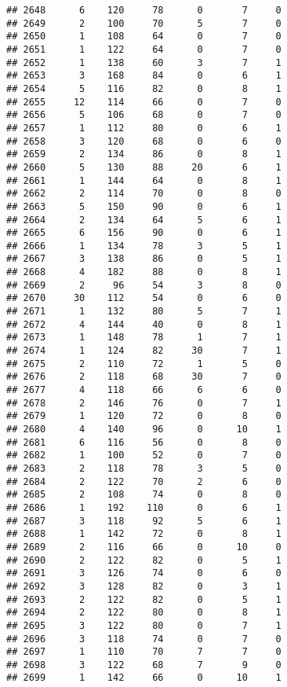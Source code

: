 \documentclass[
]{article}
\begin{document}
\begin{verbatim}
## 2648      6    120     78      0       7     0
## 2649      2    100     70      5       7     0
## 2650      1    108     64      0       7     0
## 2651      1    122     64      0       7     0
## 2652      1    138     60      3       7     1
## 2653      3    168     84      0       6     1
## 2654      5    116     82      0       8     1
## 2655     12    114     66      0       7     0
## 2656      5    106     68      0       7     0
## 2657      1    112     80      0       6     1
## 2658      3    120     68      0       6     0
## 2659      2    134     86      0       8     1
## 2660      5    130     88     20       6     1
## 2661      1    144     64      0       8     1
## 2662      2    114     70      0       8     0
## 2663      5    150     90      0       6     1
## 2664      2    134     64      5       6     1
## 2665      6    156     90      0       6     1
## 2666      1    134     78      3       5     1
## 2667      3    138     86      0       5     1
## 2668      4    182     88      0       8     1
## 2669      2     96     54      3       8     0
## 2670     30    112     54      0       6     0
## 2671      1    132     80      5       7     1
## 2672      4    144     40      0       8     1
## 2673      1    148     78      1       7     1
## 2674      1    124     82     30       7     1
## 2675      2    110     72      1       5     0
## 2676      2    118     68     30       7     0
## 2677      4    118     66      6       6     0
## 2678      2    146     76      0       7     1
## 2679      1    120     72      0       8     0
## 2680      4    140     96      0      10     1
## 2681      6    116     56      0       8     0
## 2682      1    100     52      0       7     0
## 2683      2    118     78      3       5     0
## 2684      2    122     70      2       6     0
## 2685      2    108     74      0       8     0
## 2686      1    192    110      0       6     1
## 2687      3    118     92      5       6     1
## 2688      1    142     72      0       8     1
## 2689      2    116     66      0      10     0
## 2690      2    122     82      0       5     1
## 2691      3    126     74      0       6     0
## 2692      3    128     82      0       3     1
## 2693      2    122     82      0       5     1
## 2694      2    122     80      0       8     1
## 2695      3    122     80      0       7     1
## 2696      3    118     74      0       7     0
## 2697      1    110     70      7       7     0
## 2698      3    122     68      7       9     0
## 2699      1    142     66      0      10     1

\end{verbatim}
\end{document}

